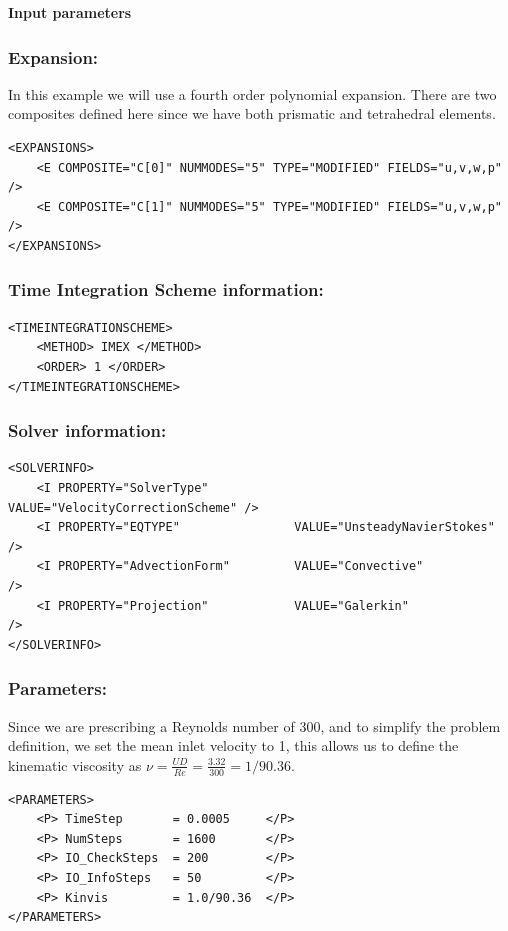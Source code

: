 \textbf{Input parameters}

\subsubsection{Expansion:~} In this example we will use a fourth order polynomial expansion. There are two composites defined here since we have both prismatic and tetrahedral elements.
\begin{lstlisting}[style=XMLStyle]
<EXPANSIONS>
    <E COMPOSITE="C[0]" NUMMODES="5" TYPE="MODIFIED" FIELDS="u,v,w,p" />
    <E COMPOSITE="C[1]" NUMMODES="5" TYPE="MODIFIED" FIELDS="u,v,w,p" />
</EXPANSIONS>
\end{lstlisting}

\subsubsection{Time Integration Scheme information:~}
\begin{lstlisting}[style=XMLStyle]
<TIMEINTEGRATIONSCHEME>
    <METHOD> IMEX </METHOD>
    <ORDER> 1 </ORDER>
</TIMEINTEGRATIONSCHEME>
\end{lstlisting}

\subsubsection{Solver information:~}
\begin{lstlisting}[style=XMLStyle]
<SOLVERINFO>
    <I PROPERTY="SolverType"            VALUE="VelocityCorrectionScheme" />
    <I PROPERTY="EQTYPE"                VALUE="UnsteadyNavierStokes"     />
    <I PROPERTY="AdvectionForm"         VALUE="Convective"               />
    <I PROPERTY="Projection"            VALUE="Galerkin"                 />
</SOLVERINFO>
\end{lstlisting}

\subsubsection{Parameters:~} Since we are prescribing a Reynolds number of 300, and to simplify the problem definition, we set the mean inlet velocity to 1, this allows us to define the kinematic viscosity as $\nu = \frac{UD}{Re}=\frac{3.32}{300} = 1/90.36$.

\begin{lstlisting}[style=XMLStyle]
<PARAMETERS>
    <P> TimeStep       = 0.0005     </P>
    <P> NumSteps       = 1600       </P>
    <P> IO_CheckSteps  = 200        </P>
    <P> IO_InfoSteps   = 50         </P>
    <P> Kinvis         = 1.0/90.36  </P>
</PARAMETERS>
\end{lstlisting}

